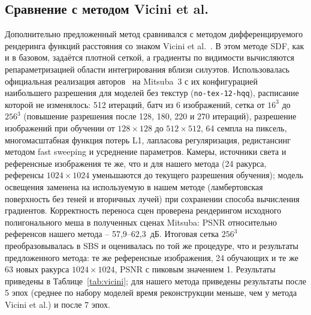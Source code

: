 \subsection*{Сравнение с методом Vicini et al.}

Дополнительно предложенный метод сравнивался с методом дифференцируемого рендеринга функций расстояния со знаком Vicini et al.~\cite{WASSDF2022}. В этом методе SDF, как и в базовом, задаётся плотной сеткой, а градиенты по видимости вычисляются репараметризацией области интегрирования вблизи силуэтов. Использовалась официальная реализация авторов~\cite{WASSDF2022Repo} на Mitsuba~3 с их конфигурацией наибольшего разрешения для моделей без текстур (\texttt{no-tex-12-hqq}), расписание которой не изменялось: 512 итераций, батч из 6 изображений, сетка от $16^3$ до $256^3$ (повышение разрешения после 128, 180, 220 и 270 итераций), разрешение изображений при обучении от $128\times128$ до $512\times512$, 64 семпла на пиксель, многомасштабная функция потерь L1, лапласова регуляризация, редистансинг методом fast sweeping и усреднение параметров. Камеры, источники света и референсные изображения те же, что и для нашего метода (24 ракурса, референсы $1024\times1024$ уменьшаются до текущего разрешения обучения); модель освещения заменена на используемую в нашем методе (ламбертовская поверхность без теней и вторичных лучей) при сохранении способа вычисления градиентов. Корректность переноса сцен проверена рендерингом исходного полигонального меша в полученных сценах Mitsuba: PSNR относительно референсов нашего метода -- 57,9--62,3~дБ. Итоговая сетка $256^3$ преобразовывалась в SBS и оценивалась по той же процедуре, что и результаты предложенного метода: те же референсные изображения, 24 обучающих и те же 63 новых ракурса $1024\times1024$, PSNR с пиковым значением 1. Результаты приведены в Таблице~\ref{tab:vicini}; для нашего метода приведены результаты после 5 эпох (среднее по набору моделей время реконструкции меньше, чем у метода Vicini et al.) и после 7 эпох.

